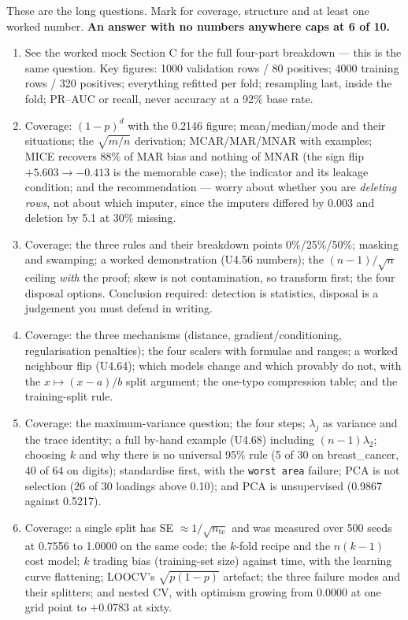 \documentclass[11pt,a4paper]{article}
\newcommand{\A}[1]{\item[\textbf{#1}]}
\begin{document}
\noindent\small These are the long questions. Mark for coverage, structure and
at least one worked number. \textbf{An answer with no numbers anywhere caps at
6 of 10.}\normalsize

\begin{enumerate}[leftmargin=1.9cm]
\A{U4.77} See the worked mock Section C for
the full four-part breakdown --- this is the same question. Key figures: 1000
validation rows / 80 positives; 4000 training rows / 320 positives; everything
refitted per fold; resampling last, inside the fold; PR--AUC or recall, never
accuracy at a 92\% base rate.

\A{U4.78} Coverage: $(1-p)^d$ with the 0.2146 figure; mean/median/mode and
their situations; the $\sqrt{m/n}$ derivation; MCAR/MAR/MNAR with examples;
MICE recovers 88\% of MAR bias and nothing of MNAR (the sign flip
$+5.603 \to -0.413$ is the memorable case); the indicator and its leakage
condition; and the recommendation --- worry about whether you are \emph{deleting
rows}, not about which imputer, since the imputers differed by 0.003 and
deletion by 5.1 at 30\% missing.

\A{U4.79} Coverage: the three rules and their breakdown points 0\%/25\%/50\%;
masking and swamping; a worked demonstration (U4.56 numbers); the
$(n-1)/\sqrt n$ ceiling \emph{with} the proof; skew is not contamination, so
transform first; the four disposal options. Conclusion required: detection is
statistics, disposal is a judgement you must defend in writing.

\A{U4.80} Coverage: the three mechanisms (distance, gradient/conditioning,
regularisation penalties); the four scalers with formulae and ranges; a worked
neighbour flip (U4.64); which models change and which provably do not, with the
$x \mapsto (x-a)/b$ split argument; the one-typo compression table; and the
training-split rule.

\A{U4.81} Coverage: the maximum-variance question; the four steps; $\lambda_j$
as variance and the trace identity; a full by-hand example (U4.68) including
$(n-1)\lambda_2$; choosing $k$ and why there is no universal 95\% rule (5 of 30
on breast\_cancer, 40 of 64 on digits); standardise first, with the
\texttt{worst area} failure; PCA is not selection (26 of 30 loadings above
0.10); and PCA is unsupervised (0.9867 against 0.5217).

\A{U4.82} Coverage: a single split has SE $\approx 1/\sqrt{n_{\text{te}}}$ and
was measured over 500 seeds at 0.7556 to 1.0000 on the same code; the $k$-fold
recipe and the $n(k-1)$ cost model; $k$ trading bias (training-set size) against
time, with the learning curve flattening; LOOCV's $\sqrt{p(1-p)}$ artefact; the
three failure modes and their splitters; and nested CV, with optimism growing
from 0.0000 at one grid point to $+0.0783$ at sixty.


\end{enumerate}
\end{document}
